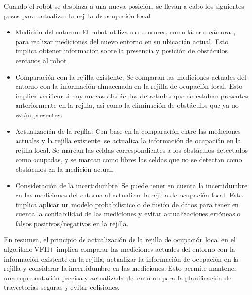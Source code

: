\documentclass{article}
\begin{document}
\begin{itemize}
  Cuando el robot se desplaza a una nueva posición, se llevan a cabo los siguientes pasos para actualizar la rejilla de ocupación local

  \begin{itemize}
  \item Medición del entorno: El robot utiliza sus sensores, como láser o cámaras, para realizar mediciones del nuevo entorno en su ubicación actual. Esto implica obtener información sobre la presencia y posición de obstáculos cercanos al robot.
  \item Comparación con la rejilla existente: Se comparan las mediciones actuales del entorno con la información almacenada en la rejilla de ocupación local. Esto implica verificar si hay nuevos obstáculos detectados que no estaban presentes anteriormente en la rejilla, así como la eliminación de obstáculos que ya no están presentes.
  \item Actualización de la rejilla: Con base en la comparación entre las mediciones actuales y la rejilla existente, se actualiza la información de ocupación en la rejilla local. Se marcan las celdas correspondientes a los obstáculos detectados como ocupadas, y se marcan como libres las celdas que no se detectan como obstáculos en la medición actual.
  \item Consideración de la incertidumbre: Se puede tener en cuenta la incertidumbre en las mediciones del entorno al actualizar la rejilla de ocupación local. Esto implica aplicar un modelo probabilístico o de fusión de datos para tener en cuenta la confiabilidad de las mediciones y evitar actualizaciones erróneas o falsos positivos/negativos en la rejilla.
  \end{itemize}

  En resumen, el principio de actualización de la rejilla de ocupación local en el algoritmo VFH+ implica comparar las mediciones actuales del entorno con la información existente en la rejilla, actualizar la información de ocupación en la rejilla y considerar la incertidumbre en las mediciones. Esto permite mantener una representación precisa y actualizada del entorno para la planificación de trayectorias seguras y evitar colisiones.
  
\end{itemize}
\end{document}
